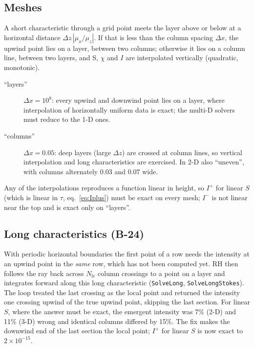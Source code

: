 \documentclass[11pt,a4paper]{article}
\newcommand{\code}[1]{\texttt{#1}}
\begin{document}
\subsection{Meshes}
A short characteristic through a grid point meets the layer above or
below at a horizontal distance $\Delta z\,|\mu_x/\mu_z|$. If that is less
than the column spacing $\Delta x$, the upwind point lies on a layer,
between two columns; otherwise it lies on a column line, between two
layers, and S, $\chi$ and $I$ are interpolated vertically (quadratic,
monotonic).
\begin{description}
\item[``layers''] $\Delta x = 10^8$: every upwind and downwind point lies
  on a layer, where interpolation of horizontally uniform data is exact;
  the multi-D solvers must reduce to the 1-D ones.
\item[``columns''] $\Delta x = 0.05$: deep layers (large $\Delta z$) are
  crossed at column lines, so vertical interpolation and long
  characteristics are exercised. In 2-D also ``uneven'', with columns
  alternately $0.03$ and $0.07$ wide.
\end{description}
Any of the interpolations reproduces a function linear in height, so
$I^+$ for linear $S$ (which is linear in $\tau$, eq.~\ref{eq:Iplus}) must
be exact on every mesh; $I^-$ is not linear near the top and is exact
only on ``layers''.

\subsection{Long characteristics (B-24)}
With periodic horizontal boundaries the first point of a row needs the
intensity at an upwind point in the \emph{same} row, which has not been
computed yet. RH then follows the ray back across $N_\text{lc}$ column
crossings to a point on a layer and integrates forward along this long
characteristic (\code{SolveLong}, \code{SolveLongStokes}). The loop
treated the last crossing as the local point and returned the intensity
one crossing upwind of the true upwind point, skipping the last section.
For linear $S$, where the answer must be exact, the emergent intensity
was 7\% (2-D) and 11\% (3-D) wrong and identical columns differed by
15\%. The fix makes the downwind end of the last section the local
point; $I^+$ for linear $S$ is now exact to $2\times10^{-15}$.
\end{document}
